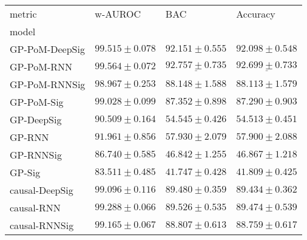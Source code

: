 \begin{tabular}{llll}
\toprule
metric &                                        w-AUROC &                                            BAC &                                       Accuracy \\
model          &                                                &                                                &                                                \\
\midrule
GP-PoM-DeepSig &                           $ 99.515 \pm 0.078 $ &                           $ 92.151 \pm 0.555 $ &                           $ 92.098 \pm 0.548 $ \\
GP-PoM-RNN     &                           $ 99.564 \pm 0.072 $ &            $  \underline{ 92.757 \pm 0.735 } $ &            $  \underline{ 92.699 \pm 0.733 } $ \\
GP-PoM-RNNSig  &                           $ 98.967 \pm 0.253 $ &                           $ 88.148 \pm 1.588 $ &                           $ 88.113 \pm 1.579 $ \\
GP-PoM-Sig     &                           $ 99.028 \pm 0.099 $ &                           $ 87.352 \pm 0.898 $ &                           $ 87.290 \pm 0.903 $ \\
\midrule
GP-DeepSig     &                           $ 90.509 \pm 0.164 $ &                           $ 54.545 \pm 0.426 $ &                           $ 54.513 \pm 0.451 $ \\
GP-RNN         &                           $ 91.961 \pm 0.856 $ &                           $ 57.930 \pm 2.079 $ &                           $ 57.900 \pm 2.088 $ \\
GP-RNNSig      &                           $ 86.740 \pm 0.585 $ &                           $ 46.842 \pm 1.255 $ &                           $ 46.867 \pm 1.218 $ \\
GP-Sig         &                           $ 83.511 \pm 0.485 $ &                           $ 41.747 \pm 0.428 $ &                           $ 41.809 \pm 0.425 $ \\
\midrule
causal-DeepSig &                           $ 99.096 \pm 0.116 $ &                           $ 89.480 \pm 0.359 $ &                           $ 89.434 \pm 0.362 $ \\
causal-RNN     &                           $ 99.288 \pm 0.066 $ &                           $ 89.526 \pm 0.535 $ &                           $ 89.474 \pm 0.539 $ \\
causal-RNNSig  &                           $ 99.165 \pm 0.067 $ &                           $ 88.807 \pm 0.613 $ &                           $ 88.759 \pm 0.617 $ \\

\end{tabular}
